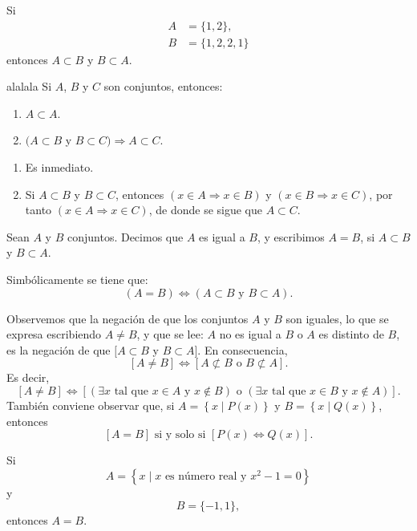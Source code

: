\begin{examplebox}{}{}
    Si
    \begin{align*}
        A & = \{1, 2\}, \\
        B & = \{1, 2, 2, 1\}
    \end{align*}
    entonces $A \subset B$ y $B \subset A$.
\end{examplebox}

\begin{prop}{}{alalala}
    Si $A$, $B$ y $C$ son conjuntos, entonces:
    \begin{enumerate}[label=\roman*., topsep=6pt, itemsep=0pt]
        \item $A \subset A$.
        \item $(A \subset B$ y $B \subset C) \Longrightarrow A \subset C$.
    \end{enumerate}
    \tcblower
    \demostracion
    \begin{enumerate}[label=\roman*., topsep=6pt, itemsep=0pt]
        \item Es inmediato.
        \item Si $A \subset B$ y $B \subset C$, entonces $(x \in A \Longrightarrow x \in B)$ y $(x \in B \Longrightarrow x \in C)$, por tanto $(x \in A \Longrightarrow x \in C)$, de donde se sigue que $A \subset C$.
    \end{enumerate}
\end{prop}

\begin{definicion}{}{}
    Sean $A$ y $B$ conjuntos. Decimos que $A$ es igual a $B$, y escribimos $A = B$, si $A \subset B$ y $B \subset A$.
\end{definicion}

Simbólicamente se tiene que:
$$(A = B) \Longleftrightarrow (A \subset B \text{ y } B \subset A).$$

Observemos que la negación de que los conjuntos $A$ y $B$ son iguales, lo que se expresa escribiendo $A \neq B$, y que se lee: $A$ no es igual a $B$ o $A$ es distinto de $B$, es la negación de que $[A \subset B$ y $B \subset A]$. En consecuencia,
$$[A \neq B] \Longleftrightarrow[A \not \subset B \text{ o } B \not \subset A].$$
Es decir,
$$[A \neq B] \Longleftrightarrow[(\exists x \text{ tal que } x \in A \text { y } x \notin B) \text { o }(\exists x \text{ tal que } x \in B \text{ y } x \notin A)].$$
También conviene observar que, si $A=\left\{x \mid P(x) \right\} \text { y } B=\left\{x \mid Q(x)\right\}$, entonces
$$[A = B] \text{ si y solo si } [P(x) \Longleftrightarrow Q(x)].$$
\begin{examplebox}{}{}
    Si
    $$A = \left\{ x \mid x \text{ es número real y } x^2 - 1 = 0 \right\}$$
    y
    $$B = \{ -1,  1 \},$$
    entonces $A = B$.
\end{examplebox}


